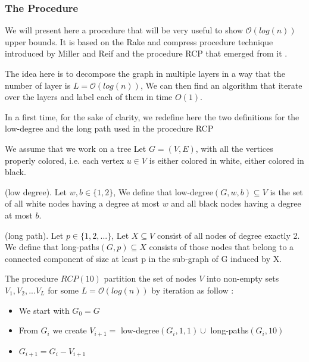 \subsubsection{The Procedure}
We will present here a procedure that will be very useful to show $\mathcal{O}(log(n))$ upper bounds. It is based on the Rake and compress procedure technique introduced by Miller and Reif \cite{RC} and the procedure RCP that emerged from it \cite{1}.

The idea here is to decompose the graph in multiple layers in a way that the number of layer is $L = \mathcal{O}(log(n))$, We can then find an algorithm that iterate over the layers and label each of them in time $O(1)$.

In a first time, for the sake of clarity, we redefine here the two definitions for the low-degree and the long path used in the procedure RCP \cite[p.21]{1}

We assume that we work on a tree Let $G = (V,E)$, with all the vertices properly colored, i.e. each vertex $u\in V$ is either colored in white, either colored in black.

\begin{defi} (low degree).
Let $w,b \in \{1,2\}$, We define that low-degree$(G,w,b)\subseteq V$ is the set of all white nodes having a degree at most $w$ and all black nodes having a degree at most $b$.
\end{defi}

\begin{defi} (long path).
Let $p \in \{1,2,...\}$, Let $X \subseteq V$ consist of all nodes of degree exactly 2. We define that long-paths$(G, p)\subseteq X$ consists of those nodes that belong to a connected component of size at least p in the sub-graph of G induced by X.
\end{defi}

The procedure $RCP(10)$ partition the set of nodes $V$ into non-empty sets $V_1,V_2,...V_L$ for some $L = \mathcal{O}(log(n))$ by iteration as follow \cite[p.23]{1}:
\begin{itemize}
    \item We start with $G_0 = G$
    \item From $G_i$ we create $V_{i+1} = $ low-degree$(G_i,1,1)\cup $ long-paths$(G_i,10)$
    \item $G_{i+1} = G_i- V_{i+1}$
\end{itemize}

